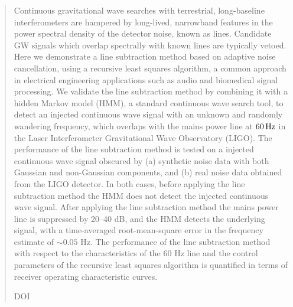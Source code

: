 \documentclass[pra,superscriptaddress,reprint,amsmath,amssymb,nofootinbib]{revtex4-2}
\begin{document}
\begin{abstract}
		Continuous gravitational wave searches with terrestrial, long-baseline interferometers are hampered by long-lived, narrowband features in the power spectral density of the detector noise, known as lines. Candidate GW signals which overlap spectrally with known lines are typically vetoed. Here we demonstrate a line subtraction method based on adaptive noise cancellation, using a recursive least squares algorithm, a common approach in electrical engineering applications such as audio and biomedical signal processing. We validate the line subtraction method by combining it with a hidden Markov model (HMM), a standard continuous wave search tool, to detect an injected continuous wave signal with an unknown and randomly wandering frequency, which overlaps with the mains power line at $60 \, {\rm Hz}$ in the Laser Interferometer Gravitational Wave Observatory (LIGO). The performance of the line subtraction method is tested on a injected continuous wave signal obscured by (a) synthetic noise data with both Gaussian and non-Gaussian components, and (b) real noise data obtained from the LIGO detector. In both cases, before applying the line subtraction method the HMM does not detect the injected continuous wave signal. After applying the line subtraction method the mains power line is suppressed by 20--40 dB, and the HMM detects the underlying signal, with a time-averaged root-mean-square error in the frequency estimate of $\sim 0.05 $ Hz. The performance of the line subtraction method with respect to the characteristics of the 60 Hz line and the control parameters of the recursive least squares algorithm is quantified in terms of receiver operating characteristic curves.
		
		

\begin{description}
\item[DOI]
\end{description}
\end{abstract}



\maketitle	
\end{document}

